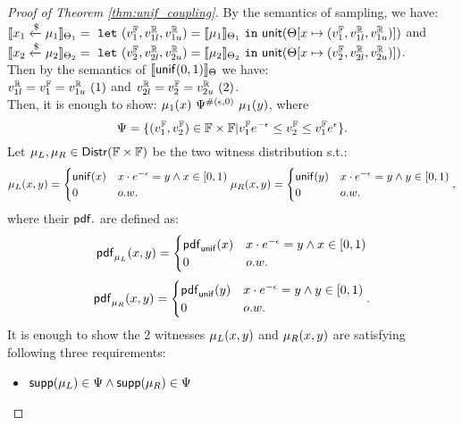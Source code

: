 \documentclass[a4paper,11pt]{article}
\begin{document}
\begin{proof}[Proof of Theorem \ref{thm:unif_coupling}]
	By the semantics of sampling, we have:\\
	$\llbracket x_1 \xleftarrow{\$} \mu_1 \rrbracket_{\Theta_1} = 
	~\mathtt{let}~ (v^{\mathbb{F}}_1, v^{\mathbb{R}}_{1l}, v^{\mathbb{R}}_{1u}) 
	= \llbracket \mu_1 \rrbracket_{\Theta_1} 
	~\mathtt{in}~ 
	\mathsf{unit}(\Theta[x \mapsto (v^{\mathbb{F}}_1, v^{\mathbb{R}}_{1l}, v^{\mathbb{R}}_{1u})])
	$ and 
	\\
	$\llbracket x_2 \xleftarrow{\$} \mu_2 \rrbracket_{\Theta_2} = 
	~\mathtt{let}~ (v^{\mathbb{F}}_2, v^{\mathbb{R}}_{2l}, v^{\mathbb{R}}_{2u}) 
	= \llbracket \mu_2 \rrbracket_{\Theta_2} 
	~\mathtt{in}~ 
	\mathsf{unit}(\Theta[x \mapsto (v^{\mathbb{F}}_2, v^{\mathbb{R}}_{2l}, v^{\mathbb{R}}_{2u})])
	$. \\
	Then by the semantics of $\llbracket \mathsf{unif}(0, 1) \rrbracket_{\Theta}$ we have:
	\\
	$ v^{\mathbb{R}}_{1l} = v^{\mathbb{F}}_1 = v^{\mathbb{R}}_{1u} ~ (1)$ 
	and
	$ v^{\mathbb{R}}_{2l} = v^{\mathbb{F}}_2 = v^{\mathbb{R}}_{2u} ~ (2)$.
	\\
	Then, it is enough to show:
	${\mu_1}(x) ~ \Psi^{\#(\epsilon, 0)} ~ {\mu_1}(y)$, where
	\[
		\Psi = \{(v^{\mathbb{F}}_1, v^{\mathbb{F}}_2) \in \mathbb{F} \times \mathbb{F}
		| 
		v^{\mathbb{F}}_1 e^{-\epsilon} 
		\leq v^{\mathbb{F}}_2
		\leq v^{\mathbb{F}}_1 e^{\epsilon} \}.
	\]
%
%
Let $\mu_L, \mu_R \in \mathsf{Distr}(\mathbb{F} \times \mathbb{F})$ be the two witness distribution s.t.:
\[
	{\mu_L}(x, y) = 
	\begin{cases}
	{\mathsf{unif}}(x) & x \cdot e^{-\epsilon} = y \land x \in [0, 1)\\
	0       & o.w.
	\end{cases}
	\\
	{\mu_R}(x, y) = 
	\begin{cases}
	{\mathsf{unif}}(y) & x \cdot e^{-\epsilon} = y \land y \in [0, 1)\\
	0       & o.w.
	\end{cases},
\]
%
%
where their $\mathsf{pdf}.$ are defined as:
\[
	\mathsf{pdf}_{\mu_L}(x, y) = 
	\begin{cases}
	\mathsf{pdf}_{\mathsf{unif}}(x) & x \cdot e^{-\epsilon} = y \land x \in [0, 1)\\
	0       & o.w.
	\end{cases}
\]
%
\[
	\mathsf{pdf}_{\mu_R}(x, y) = 
	\begin{cases}
	\mathsf{pdf}_{\mathsf{unif}}(y) & x \cdot e^{-\epsilon} = y \land y \in [0, 1)\\
	0       & o.w.
	\end{cases}.
\]
It is enough to show the 2 witnesses $\mu_L(x, y)$ and $\mu_R(x, y)$ are satisfying following three requirements:
\begin{itemize}
	\item $\mathsf{supp}(\mu_L) \in \Psi \land \mathsf{supp}(\mu_R) \in \Psi$


\end{itemize}
\end{proof}
\end{document}
